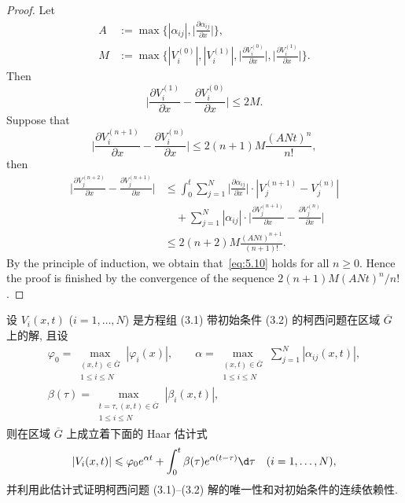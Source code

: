 \begin{proof}
  Let
  \begin{align*}
    A & := \max \biggl\{|\alpha_{ij}|, \biggl|\frac{\partial\alpha_{ij}}{\partial x}\biggr|\biggr\}, \\
    M & := \max \biggl\{|V_i^{(0)}|, |V_i^{(1)}|,
                  \biggl|\frac{\partial V_i^{(0)}}{\partial x}\biggr|,
                  \biggl|\frac{\partial V_i^{(1)}}{\partial x}\biggr|\biggr\}.
  \end{align*}
  Then
  \[ \biggl|\frac{\partial V_i^{(1)}}{\partial x} - \frac{\partial V_i^{(0)}}{\partial x}\biggr|
        \leq 2M. \]
  Suppose that 
  \begin{equation}\label{eq:5.10}
    \biggl|\frac{\partial V_i^{(n+1)}}{\partial x} - \frac{\partial V_i^{(n)}}{\partial x}\biggr|
      \leq 2(n+1)M\frac{(ANt)^n}{n!},
  \end{equation}
  then
  \begin{align*}
    \biggl|\frac{\partial V_j^{(n+2)}}{\partial x} - \frac{\partial V_j^{(n+1)}}{\partial x}\biggr|
    & \leq \int_0^t \sum_{j=1}^N \biggl|\frac{\partial\alpha_{ij}}{\partial x}\biggr|
        \cdot |V_j^{(n+1)} - V_j^{(n)}| \\
    & \quad + \sum_{j=1}^N |\alpha_{ij}|
        \cdot \biggl|\frac{\partial V_j^{(n+1)}}{\partial x}-\frac{\partial V_j^{(n)}}{\partial x}\biggr| \\
    & \leq 2(n+2)M \frac{(ANt)^{n+1}}{(n+1)!}.
  \end{align*}
  By the principle of induction, we obtain that~\eqref{eq:5.10} holds for all $n\geq 0$.
  Hence the proof is finished by the convergence of the sequence
  $2(n+1)M(ANt)^n/n!$.
\end{proof}


\begin{exercise}
  设 $V_i(x,t)$ ($i=1,\ldots,N$) 是方程组 (3.1) 带初始条件 (3.2)
  的柯西问题在区域 $\overline{G}$ 上的解, 且设
  \begin{gather*}
    \varphi_0 = \max_{\substack{(x,t)\in\overline{G} \\ 1\leq i\leq N}} |\varphi_i(x)|,
    \qquad
    \alpha = \max_{\substack{(x,t)\in\overline{G} \\ 1\leq i\leq N}} \sum_{j=1}^N |\alpha_{ij}(x,t)|, \\
    \beta(\tau) = \max_{\substack{t=\tau, (x,t)\in\overline{G} \\ 1\leq i\leq N}} |\beta_i(x,t)|,
  \end{gather*}
  则在区域 $\overline{G}$ 上成立着下面的 Haar 估计式
  \[ |V_i(x,t)| \leq \varphi_0 e^{\alpha t} + \int_0^t \beta(\tau) e^{\alpha(t-\tau)} \d\tau
      \quad (i=1,\ldots,N),\]
  并利用此估计式证明柯西问题 (3.1)--(3.2) 解的唯一性和对初始条件的连续依赖性.
\end{exercise}

